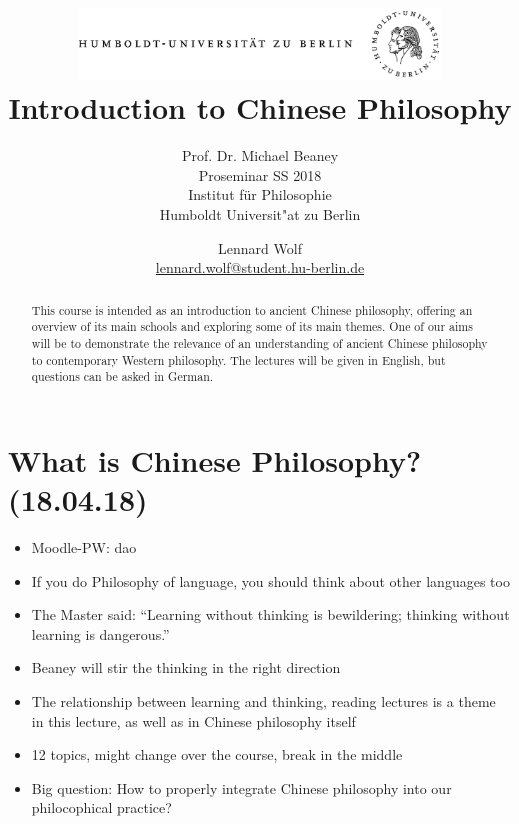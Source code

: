 \documentclass[emulatestandardclasses]{scrartcl}
\date{\vspace{-3ex}}
\begin{document}
\title{
	\includegraphics*[bb=0 0 720 200, width=0.72\textwidth]{ErstesSem/images/hu_logo.png}\\
	\vspace{25pt}
	Introduction to Chinese Philosophy}
\subtitle{\vspace{10pt}
			Prof. Dr. Michael Beaney\\
			Proseminar SS 2018\\
          Institut für Philosophie\\ 
          Humboldt Universit"at zu Berlin}
\author{Lennard Wolf\\
        \small{\href{mailto:lennard.wolf@student.hu-berlin.de}{lennard.wolf@student.hu-berlin.de}}}
\maketitle
\begin{abstract}

This course is intended as an introduction to ancient Chinese philosophy, offering an overview of its main schools and exploring some of its main themes. One of our aims will be to demonstrate the relevance of an understanding of ancient Chinese philosophy to contemporary Western philosophy. The lectures will be given in English, but questions can be asked in German.

\end{abstract}
\newpage

\tableofcontents
\newpage


\section{What is Chinese Philosophy?\\(18.04.18)}

\begin{itemize}
  \item Moodle-PW: dao
  \item If you do Philosophy of language, you should think about other languages too
  \item The Master said: “Learning without thinking is bewildering; thinking without learning is dangerous.”
  \item Beaney will stir the thinking in the right direction
  \item The relationship between learning and thinking, reading lectures is a theme in this lecture, as well as in Chinese philosophy itself
  \item 12 topics, might change over the course, break in the middle
  \item Big question: How to properly integrate Chinese philosophy into our philocophical practice?
\end{itemize}
\end{document}
